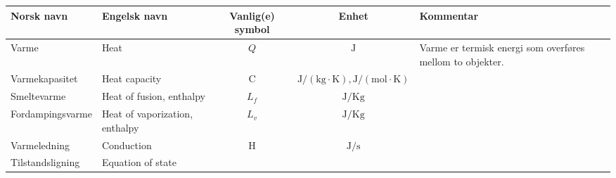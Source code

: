 \documentclass[a4paper,norsk,12pt]{article}
\begin{document}
\begin{landscape}
\begin{table}
\begin{tabular}{|l|l|c|c|l|}
\hline
Norsk navn & Engelsk navn & \parbox{1.5 cm}{Vanlig(e) symbol} & Enhet & Kommentar \\
\hline
\hline
Varme & Heat & $Q$ & $\mathrm{J}$ & \parbox{6cm}{Varme er termisk energi som overføres mellom to objekter.}\\
Varmekapasitet & Heat capacity & C & $\mathrm{J/(kg\cdot K), J/(mol\cdot K)}$ & \\
Smeltevarme & Heat of fusion, enthalpy & $L_f$ & $\mathrm{J/Kg}$ & \\
Fordampingsvarme & Heat of vaporization, enthalpy & $L_v$ & $\mathrm{J/Kg}$ & \\
Varmeledning & Conduction & H & $\mathrm{J/s}$ & \\
Tilstandsligning & Equation of state & & & \\

\hline
\end{tabular}
\end{table}
\end{landscape}
\end{document}
